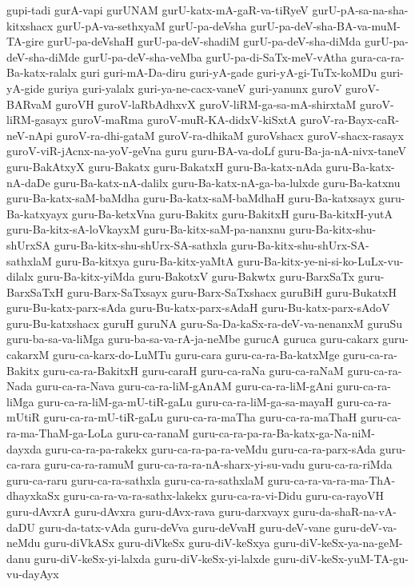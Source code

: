 {gupi-tadi
gurA-vapi
gurUNAM
gurU-katx-mA-gaR-va-tiRyeV
gurU-pA-sa-na-sha-kitxshacx
gurU-pA-va-sethxyaM
gurU-pa-deVsha
gurU-pa-deV-sha-BA-va-muM-TA-gire
gurU-pa-deVshaH
gurU-pa-deV-shadiM
gurU-pa-deV-sha-diMda
gurU-pa-deV-sha-diMde
gurU-pa-deV-sha-veMba
gurU-pa-di-SaTx-meV-vAtha
gura-ca-ra-Ba-katx-ralalx
guri
guri-mA-Da-diru
guri-yA-gade
guri-yA-gi-TuTx-koMDu
guri-yA-gide
guriya
guri-yalalx
guri-ya-ne-cacx-vaneV
guri-yanunx
guroV
guroV-BARvaM
guroVH
guroV-laRbAdhxvX
guroV-liRM-ga-sa-mA-shirxtaM
guroV-liRM-gasayx
guroV-maRma
guroV-muR-KA-didxV-kiSxtA
guroV-ra-Bayx-caR-neV-nApi
guroV-ra-dhi-gataM
guroV-ra-dhikaM
guroVshacx
guroV-shacx-rasayx
guroV-viR-jAcnx-na-yoV-geVna
guru
guru-BA-va-doLf
guru-Ba-ja-nA-nivx-taneV
guru-BakAtxyX
guru-Bakatx
guru-BakatxH
guru-Ba-katx-nAda
guru-Ba-katx-nA-daDe
guru-Ba-katx-nA-dalilx
guru-Ba-katx-nA-ga-ba-lulxde
guru-Ba-katxnu
guru-Ba-katx-saM-baMdha
guru-Ba-katx-saM-baMdhaH
guru-Ba-katxsayx
guru-Ba-katxyayx
guru-Ba-ketxVna
guru-Bakitx
guru-BakitxH
guru-Ba-kitxH-yutA
guru-Ba-kitx-sA-loVkayxM
guru-Ba-kitx-saM-pa-nanxnu
guru-Ba-kitx-shu-shUrxSA
guru-Ba-kitx-shu-shUrx-SA-sathxla
guru-Ba-kitx-shu-shUrx-SA-sathxlaM
guru-Ba-kitxya
guru-Ba-kitx-yaMtA
guru-Ba-kitx-ye-ni-si-ko-LuLx-vu-dilalx
guru-Ba-kitx-yiMda
guru-BakotxV
guru-Bakwtx
guru-BarxSaTx
guru-BarxSaTxH
guru-Barx-SaTxsayx
guru-Barx-SaTxshacx
guruBiH
guru-BukatxH
guru-Bu-katx-parx-sAda
guru-Bu-katx-parx-sAdaH
guru-Bu-katx-parx-sAdoV
guru-Bu-katxshacx
guruH
guruNA
guru-Sa-Da-kaSx-ra-deV-va-nenanxM
guruSu
guru-ba-sa-va-liMga
guru-ba-sa-va-rA-ja-neMbe
gurucA
guruca
guru-cakarx
guru-cakarxM
guru-ca-karx-do-LuMTu
guru-cara
guru-ca-ra-Ba-katxMge
guru-ca-ra-Bakitx
guru-ca-ra-BakitxH
guru-caraH
guru-ca-raNa
guru-ca-raNaM
guru-ca-ra-Nada
guru-ca-ra-Nava
guru-ca-ra-liM-gAnAM
guru-ca-ra-liM-gAni
guru-ca-ra-liMga
guru-ca-ra-liM-ga-mU-tiR-gaLu
guru-ca-ra-liM-ga-sa-mayaH
guru-ca-ra-mUtiR
guru-ca-ra-mU-tiR-gaLu
guru-ca-ra-maTha
guru-ca-ra-maThaH
guru-ca-ra-ma-ThaM-ga-LoLa
guru-ca-ranaM
guru-ca-ra-pa-ra-Ba-katx-ga-Na-niM-dayxda
guru-ca-ra-pa-rakekx
guru-ca-ra-pa-ra-veMdu
guru-ca-ra-parx-sAda
guru-ca-rara
guru-ca-ra-ramuM
guru-ca-ra-ra-nA-sharx-yi-su-vadu
guru-ca-ra-riMda
guru-ca-raru
guru-ca-ra-sathxla
guru-ca-ra-sathxlaM
guru-ca-ra-va-ra-ma-ThA-dhayxkaSx
guru-ca-ra-va-ra-sathx-lakekx
guru-ca-ra-vi-Didu
guru-ca-rayoVH
guru-dAvxrA
guru-dAvxra
guru-dAvx-rava
guru-darxvayx
guru-da-shaR-na-vA-daDU
guru-da-tatx-vAda
guru-deVva
guru-deVvaH
guru-deV-vane
guru-deV-va-neMdu
guru-diVkASx
guru-diVkeSx
guru-diV-keSxya
guru-diV-keSx-ya-na-geM-danu
guru-diV-keSx-yi-lalxda
guru-diV-keSx-yi-lalxde
guru-diV-keSx-yuM-TA-gu-vu-dayAyx
}
